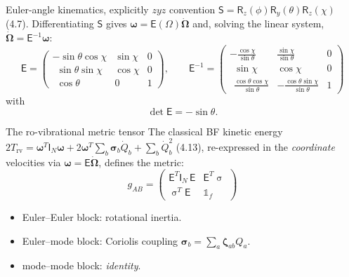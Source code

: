 \documentclass[aspectratio=169,10pt]{beamer}
\newcommand{\Msig}{\upsigma}    %
\newcommand{\stagenum}{0}
\newcommand{\setstage}[1]{\renewcommand{\stagenum}{#1}}
\begin{document}
\begin{frame}{Euler-angle kinematics, explicitly}
\setstage{3}
$zyz$ convention $\mathsf S=\mathsf R_z(\phi)\mathsf R_y(\theta)\mathsf R_z(\chi)$ (4.7). Differentiating $\mathsf S$ gives $\boldsymbol\omega=\mathsf E(\Omega)\dot{\boldsymbol\Omega}$ and, solving the linear system, $\dot{\boldsymbol\Omega}=\mathsf E^{-1}\boldsymbol\omega$:
\begin{equation*}
\mathsf E=\begin{pmatrix}-\sin\theta\cos\chi&\sin\chi&0\\ \ \ \sin\theta\sin\chi&\cos\chi&0\\ \ \ \cos\theta&0&1\end{pmatrix},\qquad
\mathsf E^{-1}=\begin{pmatrix}-\frac{\cos\chi}{\sin\theta}&\frac{\sin\chi}{\sin\theta}&0\\[3pt] \ \ \sin\chi&\cos\chi&0\\[3pt] \ \ \frac{\cos\theta\cos\chi}{\sin\theta}&-\frac{\cos\theta\sin\chi}{\sin\theta}&1\end{pmatrix} \tag{4.10, 4.12}
\end{equation*}
with
\begin{equation*}
\det\mathsf E=-\sin\theta . \tag{4.11}
\end{equation*}
\end{frame}

\begin{frame}{The ro-vibrational metric tensor}
\setstage{3}
The classical BF kinetic energy $2T_{\mathrm{rv}}=\boldsymbol\omega^{T}\mathsf I_N\boldsymbol\omega+2\boldsymbol\omega^{T}\!\sum_b\boldsymbol\sigma_b\dot Q_b+\sum_b\dot Q_b^2$ (4.13), re-expressed in the \emph{coordinate} velocities via $\boldsymbol\omega=\mathsf E\dot{\boldsymbol\Omega}$, defines the metric:
\begin{equation*}
\boxed{\;g_{AB}=
\begin{pmatrix}
\mathsf E^{T}\mathsf I_N\,\mathsf E & \mathsf E^{T}\Msig\\[3pt]
\Msig^{T}\mathsf E & \mathbb 1_f
\end{pmatrix}\;}\tag{4.15}
\end{equation*}
\begin{itemize}
  \item Euler--Euler block: rotational inertia.
  \item Euler--mode block: Coriolis coupling $\boldsymbol\sigma_b=\sum_a\boldsymbol\zeta_{ab}Q_a$.
  \item mode--mode block: \emph{identity}.
\end{itemize}
\end{frame}
\end{document}
